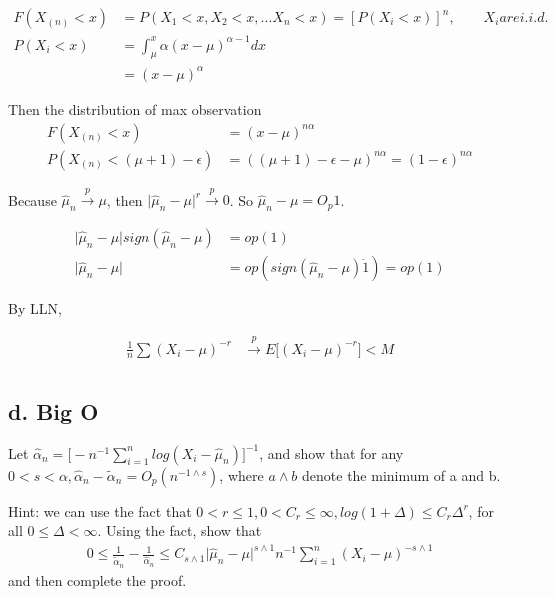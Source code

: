 \begin{align*}
	F(X_{(n)} < x) & = P(X_1 < x, X_2 < x, ... X_n < x) = [P(X_i < x)]^n, \qquad X_i are i.i.d. \\
	P(X_i < x) &= \int_{\mu}^{x} \alpha (x-\mu)^{\alpha -1} dx \\
	&= (x - \mu)^{\alpha}
\end{align*} 

Then the distribution of max observation
\begin{align*}
	F(X_{(n)} < x) & = (x - \mu)^{n \alpha}\\
	P(X_{(n)} < (\mu + 1)  -\epsilon)&= ((\mu + 1)  -\epsilon - \mu)^{n \alpha} = (1- \epsilon)^{n \alpha}
\end{align*} 


Because $\hat{\mu}_n \xrightarrow {p} \mu$, then $\Big | \hat{\mu}_n- \mu \Big | ^{r} \xrightarrow {p} 0$.
So $\hat{\mu}_n - \mu = O_p{1}$. 

\begin{align*}
	\Big | \hat{\mu}_n- \mu \Big | sign(\hat{\mu}_n - \mu ) & = op(1)\\
	\Big | \hat{\mu}_n- \mu \Big |  & = op(sign(\hat{\mu}_n - \mu ) \dot 1) = op(1)
\end{align*} 
 	
By LLN, 

\begin{align*}
	\frac{1}{n} \sum (X_i - \mu)^{-r} & \xrightarrow {p} E \Big[ (X_i - \mu)^{-r}\Big] < M\\
\end{align*} 

\subsection{d. Big O}
Let $\hat{\alpha}_n = \Big[ -n^{-1} \sum_{i=1}^n log(X_i - \hat{\mu}_n) \Big]^{-1}$, and show that for any $0 < s < \alpha, \hat{\alpha}_n - \tilde{\alpha}_n = O_p(n^{-1 \wedge s})$, where $a \wedge b$ denote the minimum of a and b. 

Hint: we can use the fact that $ 0 < r \leq 1, 0 < C_r \leq \infty, log(1+ \Delta) \leq C_r \Delta^r$, for all $0 \leq \Delta < \infty$. Using the fact, show that
\begin{align*}
	0 \leq \frac{1}{ \tilde{\alpha}_n} - \frac{1}{\hat{\alpha}_n} \leq C_{s \wedge 1} \Big | \hat{\mu}_n - \mu \Big |^{s \wedge 1} n^{-1} \sum_{i=1}^n (X_i - \mu)^{-s \wedge 1} 
\end{align*} 
and then complete the proof.

